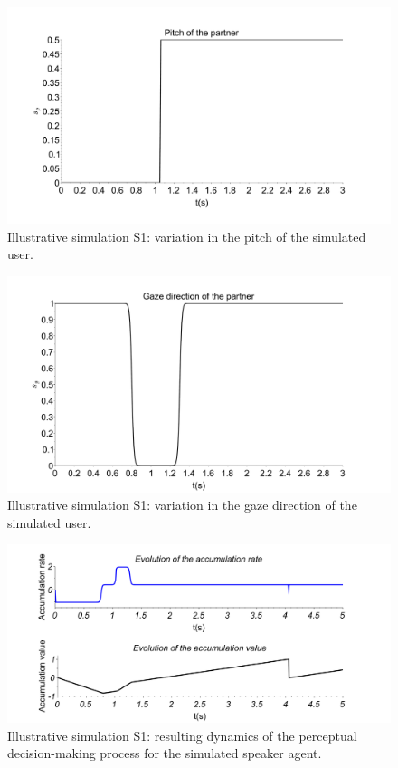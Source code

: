 \documentclass[twocolumn]{svjour3}
\begin{document}
\begin{figure}%
  \centering
  \includegraphics[width=\linewidth]{figure/Pitch_partenaire.pdf}
  \caption{Illustrative simulation S1: variation in the pitch of the simulated user.}
  \label{fig-pitch-user1}
\end{figure}

\begin{figure}
  \center
  \includegraphics[width=\linewidth]{figure/Gaze_partenaire.pdf}
  \caption{Illustrative simulation S1: variation in the gaze direction of the simulated user.}
  \label{fig-gaze-user1}
\end{figure}

\begin{figure}
  \centering
  \includegraphics[width=\linewidth]{figure/illustration_ddm_speaker.pdf}
  \caption{Illustrative simulation S1: resulting dynamics of the perceptual decision-making process for the simulated speaker agent.}
  \label{acc_example}
\end{figure}
\end{document}
